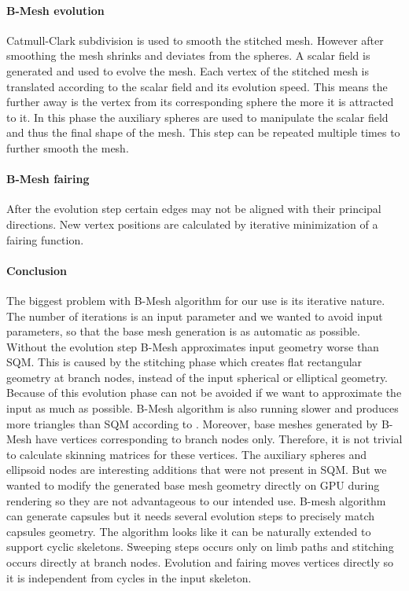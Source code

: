 \paragraph{B-Mesh evolution}
Catmull-Clark subdivision is used to smooth the stitched mesh. However after smoothing the mesh shrinks and deviates from the spheres. A scalar field is generated and used to evolve the mesh. Each vertex of the stitched mesh is translated according to the scalar field and its evolution speed. This means the further away is the vertex from its corresponding sphere the more it is attracted to it. In this phase the auxiliary spheres are used to manipulate the scalar field and thus the final shape of the mesh. This step can be repeated multiple times to further smooth the mesh.

\paragraph{B-Mesh fairing}
After the evolution step certain edges may not be aligned with their principal directions. New vertex positions are calculated by iterative minimization of a fairing function.

\paragraph{Conclusion}
The biggest problem with B-Mesh algorithm for our use is its iterative nature. The number of iterations is an input parameter and we wanted to avoid input parameters, so that the base mesh generation is as automatic as possible. Without the evolution step B-Mesh approximates input geometry worse than SQM. This is caused by the stitching phase which creates flat rectangular geometry at branch nodes, instead of the input spherical or elliptical geometry. Because of this evolution phase can not be avoided if we want to approximate the input as much as possible.
B-Mesh algorithm is also running slower and produces more triangles than SQM according to \cite{sqm}.
Moreover, base meshes generated by B-Mesh have vertices corresponding to branch nodes only.
Therefore, it is not trivial to calculate skinning matrices for these vertices.
The auxiliary spheres and ellipsoid nodes are interesting additions that were not present in SQM. But we wanted to modify the generated base mesh geometry directly on GPU during rendering so they are not advantageous to our intended use. B-mesh algorithm can generate capsules but it needs several evolution steps to precisely match capsules geometry. The algorithm looks like it can be naturally extended to support cyclic skeletons. Sweeping steps occurs only on limb paths and stitching occurs directly at branch nodes. Evolution and fairing moves vertices directly so it is independent from cycles in the input skeleton.

